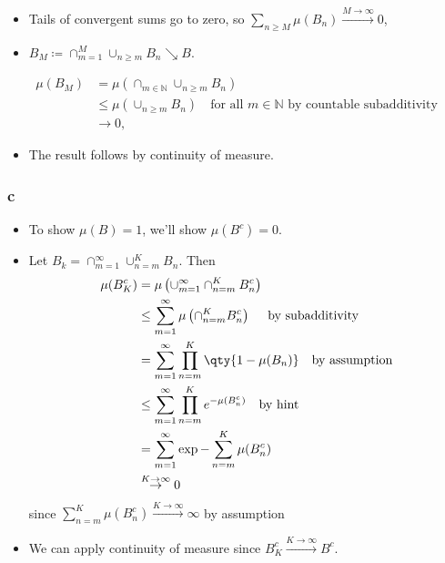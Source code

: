 \begin{solution}
\begin{itemize}
\tightlist
\item
  Tails of convergent sums go to zero, so
  \(\sum_{n\geq M} \mu(B_n) \xrightarrow{M\to\infty} 0\),
\item
  \(B_M \coloneqq\cap_{m = 1}^M \cup_{n\geq m} B_n \searrow B\).
\end{itemize}

\begin{align*}
\mu(B_M) 
&= \mu\left(\cap_{m\in {\mathbb{N}}} \cup_{n\geq m} B_n\right) \\
&\leq \mu\left( \cup_{n\geq m} B_n \right) \quad \text{for all } m\in {\mathbb{N}}\text{ by countable subadditivity} \\ 
&\to 0
,\end{align*}

\begin{itemize}
\tightlist
\item
  The result follows by continuity of measure.
\end{itemize}

\hypertarget{c}{%
\subsubsection{c}\label{c}}

\begin{itemize}
\item
  To show \(\mu(B) = 1\), we'll show \(\mu(B^c) = 0\).
\item
  Let \(B_k = \cap_{m=1}^\infty \cup_{n = m}^K B_n\). Then
  \begin{align*}
  \mu(B_K^c) 
  &= \mu \left(\cup_{m=1}^\infty \cap_{n=m}^K B_n^c\right) \\
  &\leq \sum_{m=1}^\infty \mu\left( \cap_{n=m}^K B_n^c \right) \quad\text{ by subadditivity} \\
  &= \sum_{m=1}^\infty \prod_{n=m}^K \qty{1 - \mu(B_n)} \quad \text{by assumption} \\ 
  &\leq \sum_{m=1}^\infty \prod_{n=m}^K e^{-\mu(B_n^c)} \quad\text{by hint} \\
  &= \sum_{m=1}^\infty \exp{-\sum_{n=m}^K \mu(B_n^c)} \\
  &\overset{K\to\infty}\to 0
  \end{align*}
  since
  \(\displaystyle\sum_{n=m}^K \mu(B_n^c) \overset{K\to\infty}\to \infty\)
  by assumption
\item
  We can apply continuity of measure since
  \(B_K^c \xrightarrow{K\to\infty} B^c\).
\end{itemize}


\end{solution}


